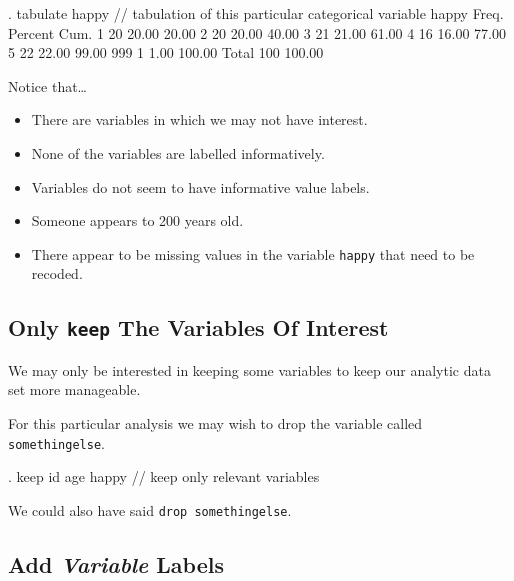 \documentclass[]{article}
\providecommand{\tightlist}{%
  \setlength{\itemsep}{0pt}\setlength{\parskip}{0pt}}
\begin{document}
\begin{stlog}
. tabulate happy // tabulation of this particular categorical variable
{\smallskip}
      happy {\VBAR}      Freq.     Percent        Cum.
          1 {\VBAR}         20       20.00       20.00
          2 {\VBAR}         20       20.00       40.00
          3 {\VBAR}         21       21.00       61.00
          4 {\VBAR}         16       16.00       77.00
          5 {\VBAR}         22       22.00       99.00
        999 {\VBAR}          1        1.00      100.00
      Total {\VBAR}        100      100.00
\end{stlog}

Notice that\ldots{}

\begin{itemize}
\tightlist
\item
  There are variables in which we may not have interest.
\item
  None of the variables are labelled informatively.
\item
  Variables do not seem to have informative value labels.
\item
  Someone appears to 200 years old.
\item
  There appear to be missing values in the variable \texttt{happy} that
  need to be recoded.
\end{itemize}

\subsection{\texorpdfstring{Only \texttt{keep} The Variables Of
Interest}{Only keep The Variables Of Interest}}\label{only-keep-the-variables-of-interest}

We may only be interested in keeping some variables to keep our analytic
data set more manageable.

For this particular analysis we may wish to drop the variable called
\texttt{somethingelse}.

\begin{stlog}
. keep id age happy // keep only relevant variables
\end{stlog}

We could also have said \texttt{drop\ somethingelse}.

\subsection{\texorpdfstring{Add \emph{Variable}
Labels}{Add Variable Labels}}\label{add-variable-labels}
\end{document}
